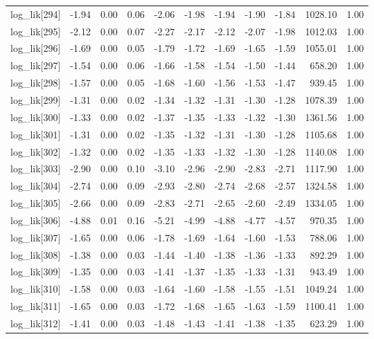 \begin{table}[ht]
\begin{tabular}{rrrrrrrrrrr}
  log\_lik[294] & -1.94 & 0.00 & 0.06 & -2.06 & -1.98 & -1.94 & -1.90 & -1.84 & 1028.10 & 1.00 \\ 
  log\_lik[295] & -2.12 & 0.00 & 0.07 & -2.27 & -2.17 & -2.12 & -2.07 & -1.98 & 1012.03 & 1.00 \\ 
  log\_lik[296] & -1.69 & 0.00 & 0.05 & -1.79 & -1.72 & -1.69 & -1.65 & -1.59 & 1055.01 & 1.00 \\ 
  log\_lik[297] & -1.54 & 0.00 & 0.06 & -1.66 & -1.58 & -1.54 & -1.50 & -1.44 & 658.20 & 1.00 \\ 
  log\_lik[298] & -1.57 & 0.00 & 0.05 & -1.68 & -1.60 & -1.56 & -1.53 & -1.47 & 939.45 & 1.00 \\ 
  log\_lik[299] & -1.31 & 0.00 & 0.02 & -1.34 & -1.32 & -1.31 & -1.30 & -1.28 & 1078.39 & 1.00 \\ 
  log\_lik[300] & -1.33 & 0.00 & 0.02 & -1.37 & -1.35 & -1.33 & -1.32 & -1.30 & 1361.56 & 1.00 \\ 
  log\_lik[301] & -1.31 & 0.00 & 0.02 & -1.35 & -1.32 & -1.31 & -1.30 & -1.28 & 1105.68 & 1.00 \\ 
  log\_lik[302] & -1.32 & 0.00 & 0.02 & -1.35 & -1.33 & -1.32 & -1.30 & -1.28 & 1140.08 & 1.00 \\ 
  log\_lik[303] & -2.90 & 0.00 & 0.10 & -3.10 & -2.96 & -2.90 & -2.83 & -2.71 & 1117.90 & 1.00 \\ 
  log\_lik[304] & -2.74 & 0.00 & 0.09 & -2.93 & -2.80 & -2.74 & -2.68 & -2.57 & 1324.58 & 1.00 \\ 
  log\_lik[305] & -2.66 & 0.00 & 0.09 & -2.83 & -2.71 & -2.65 & -2.60 & -2.49 & 1334.05 & 1.00 \\ 
  log\_lik[306] & -4.88 & 0.01 & 0.16 & -5.21 & -4.99 & -4.88 & -4.77 & -4.57 & 970.35 & 1.00 \\ 
  log\_lik[307] & -1.65 & 0.00 & 0.06 & -1.78 & -1.69 & -1.64 & -1.60 & -1.53 & 788.06 & 1.00 \\ 
  log\_lik[308] & -1.38 & 0.00 & 0.03 & -1.44 & -1.40 & -1.38 & -1.36 & -1.33 & 892.29 & 1.00 \\ 
  log\_lik[309] & -1.35 & 0.00 & 0.03 & -1.41 & -1.37 & -1.35 & -1.33 & -1.31 & 943.49 & 1.00 \\ 
  log\_lik[310] & -1.58 & 0.00 & 0.03 & -1.64 & -1.60 & -1.58 & -1.55 & -1.51 & 1049.24 & 1.00 \\ 
  log\_lik[311] & -1.65 & 0.00 & 0.03 & -1.72 & -1.68 & -1.65 & -1.63 & -1.59 & 1100.41 & 1.00 \\ 
  log\_lik[312] & -1.41 & 0.00 & 0.03 & -1.48 & -1.43 & -1.41 & -1.38 & -1.35 & 623.29 & 1.00 \\ 

\end{tabular}
\end{table}

